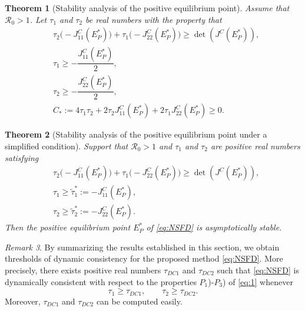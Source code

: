 \documentclass[12pt]{article}
\newtheorem{theorem}{Theorem}[section]
\theoremstyle{definition}
\theoremstyle{remark}
\newtheorem{remark}[theorem]{Remark}
\numberwithin{equation}{section}
\begin{document}
\begin{theorem}[Stability analysis of the positive equilibrium point]\label{Theorem3}
Assume that $\mathcal{R}_0 > 1$. Let $\tau_1$ and $\tau_2$ be real numbers with the property that
\begin{equation}\label{eq:DC2}
\begin{split}
&\tau_2\big(-J_{11}^C(E_P^*)\big) + \tau_1\big(-J_{22}^C(E_P^*)\big) \geq \det(J^C(E_P^*)),\\
&\tau_1 \geq -\dfrac{J_{11}^C(E_P^*)}{2},\\
&\tau_2 \geq -\dfrac{J_{22}^C(E_P^*)}{2},\\
&C_*:= 4\tau_1\tau_2 + 2\tau_2J_{11}^C(E_P^*) + 2\tau_1J_{22}^C(E_P^*) \geq 0.
\end{split}
\end{equation}
\end{theorem}
%
\begin{theorem}[Stability analysis of the positive  equilibrium point under a simplified condition]\label{Theorem4}
Support that $\mathcal{R}_0 > 1$ and $\tau_1$ and $\tau_2$ are positive real numbers satisfying
\begin{equation}\label{eq:DC2new}
\begin{split}
&\tau_2\big(-J_{11}^C(E_P^*)\big) + \tau_1\big(-J_{22}^C(E_P^*)\big) \geq \det(J^C(E_P^*)),\\
&\tau_1\geq \widetilde{\tau}_1^* := -J_{11}^C(E_P^*),\\
&\tau_2 \geq \widetilde{\tau}_2^* := -J_{22}^C(E_P^*).
\end{split}
\end{equation}
Then the positive  equilibrium point $E_P^*$ of \eqref{eq:NSFD} is asymptotically stable.
\end{theorem}
\begin{remark}
By summarizing the results established in this section, we obtain thresholds of dynamic consistency for the proposed method \eqref{eq:NSFD}. More precisely, there exists positive real numbers $\tau_{DC1}$ and $\tau_{DC2}$ such that \eqref{eq:NSFD} is dynamically consistent with respect to the properties \textbf{$P_1$})-\textbf{$P_3$}) of \eqref{eq:1} whenever
\begin{equation*}
\tau_1 \geq \tau_{DC1}, \qquad \tau_2 \geq \tau_{DC2}.
\end{equation*}
Moreover, $\tau_{DC1}$ and $\tau_{DC2}$ can be computed easily.
\end{remark}
\end{document}
